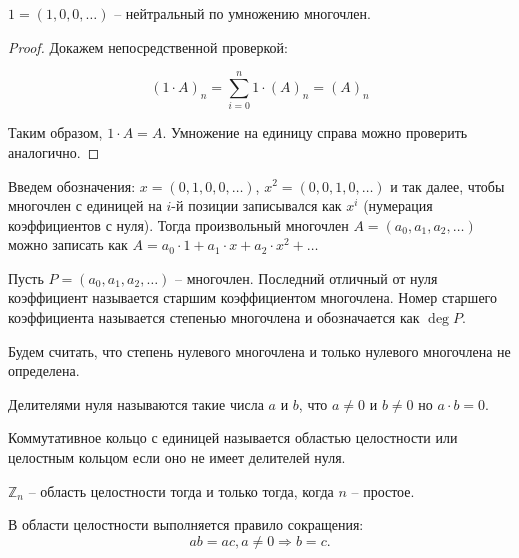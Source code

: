 \begin{note} 
    $1 = (1, 0, 0,\dots)$ -- нейтральный по умножению многочлен. 
\end{note}
\begin{proof}    
    Докажем непосредственной проверкой:

    $$(1 \cdot A)_n = \sum_{i = 0}^{n} 1\cdot(A)_n = (A)_n$$ 
    
    Таким образом, $1 \cdot A = A$. Умножение на единицу справа можно проверить аналогично.
\end{proof}

\begin{definition}
    Введем обозначения: $x = (0, 1, 0, 0, \dots)$, $x^2 = (0, 0, 1, 0, \dots)$ и так далее, чтобы многочлен 
    с единицей на $i$-й позиции записывался как $x^{i}$ (нумерация коэффициентов с нуля). Тогда произвольный многочлен 
    $A = (a_0, a_1, a_2, \dots)$ можно записать как $A = a_0 \cdot 1 + a_1 \cdot x + a_2 \cdot x^2 + \dots$
\end{definition}

\begin{definition}
    Пусть $P = (a_0, a_1, a_2, \dots)$ -- многочлен. Последний отличный от нуля коэффициент называется 
    старшим коэффициентом многочлена. Номер старшего коэффициента называется степенью многочлена и 
    обозначается как $\deg P$.
\end{definition}

\begin{note}
Будем считать, что степень нулевого многочлена и только нулевого многочлена не определена.
\end{note}

\begin{reminder}
    Делителями нуля называются такие числа $a$ и $b$, что $a \neq 0$ и $b \neq 0$ но $a \cdot b = 0$.
\end{reminder}

\begin{definition}
    Коммутативное кольцо с единицей называется областью целостности или целостным кольцом если оно 
    не имеет делителей нуля.
\end{definition}

\begin{example}
    $\mathbb{Z}_n$ -- область целостности тогда и только тогда, когда $n$ -- простое.
\end{example}

\begin{proposition} 
    \label{pr1.2}
    В области целостности выполняется правило сокращения:
    $$ab = ac, a \neq 0 \Rightarrow b = c.$$
\end{proposition}

